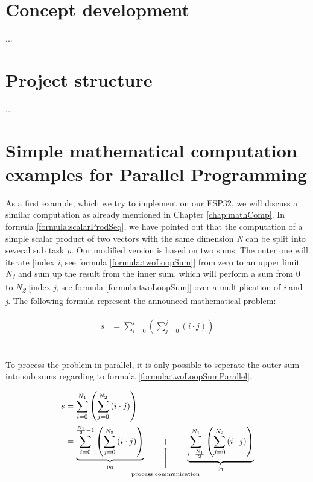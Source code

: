 \section{Concept development}

...\newpage

\section{Project structure}

...\newpage

\section{Simple mathematical computation examples for Parallel Programming}

As a first example, which we try to implement on our ESP32, we will discuss a similar computation as already mentioned in Chapter \ref{chap:mathComp}. In formula \ref{formula:scalarProdSeq}, we have pointed out that the computation of a simple scalar product of two vectors with the same dimension \textit{N} can be split into several sub task \textit{p}. Our modified version is based on two sums. The outer one will iterate [index \textit{i}, see formula \ref{formula:twoLoopSum}] from zero to an upper limit \textit{N\textsubscript{1}} and sum up the result from the inner sum, which will perform a sum from 0 to \textit{N\textsubscript{2}} [index \textit{j}, see formula \ref{formula:twoLoopSum}] over a multiplication of \textit{i} and \textit{j}. The following formula represent the announced mathematical problem:

\begin{align} \label{formula:twoLoopSum}
	\begin{aligned}
	s &= \sum_{i = 0}^{i} \left( \sum_{j = 0}^{j} \left(i \cdot j\right) \right)
	\end{aligned}
\end{align}
\

To process the problem in parallel, it is only possible to seperate the outer sum into sub sums regarding to formula \ref{formula:twoLoopSumParallel}.

\begin{align} \label{formula:twoLoopSumParallel}
	\begin{aligned}
	s &= \sum_{i = 0}^{N_1} \left( \sum_{j = 0}^{N_2} \left(i \cdot j\right) \right)
	\\ &=  \underbrace{ 
			\sum_{i = 0}^{\frac{N_1}{2} - 1} \left( \sum_{j = 0}^{N_2} \left(i \cdot j\right) \right)
 		}_\text{p\textsubscript{0}} \qquad \vertarrowbox{+}{process communication} \qquad \underbrace{  
 			\sum_{i = \frac{N_1}{2}}^{N_1} \left( \sum_{j = 0}^{N_2} \left(i \cdot j\right) \right)
		}_\text{p\textsubscript{1}}
	\end{aligned}
\end{align}
\

